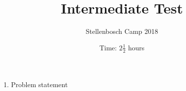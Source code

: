 \documentclass{article}
\title{Intermediate Test}
\author{Stellenbosch Camp 2018}
\date{Time: $2\frac{1}{2}$ hours}
\begin{document}
\maketitle

\begin{enumerate}[1.]

\item %
Problem statement

\end{enumerate}
\end{document}
